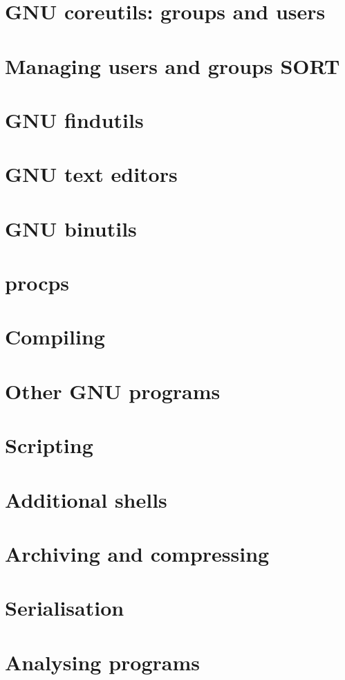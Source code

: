 \documentclass[oneside]{book}
\begin{document}
\part{GNU coreutils: groups and users}


\part{Managing users and groups SORT}



\part{GNU findutils}


\part{GNU text editors}



\part{GNU binutils}

\part{procps}


\part{Compiling}







\part{Other GNU programs}






\part{Scripting}




\part{Additional shells}






\part{Archiving and compressing}




\part{Serialisation}





\part{Analysing programs}





\end{document}
